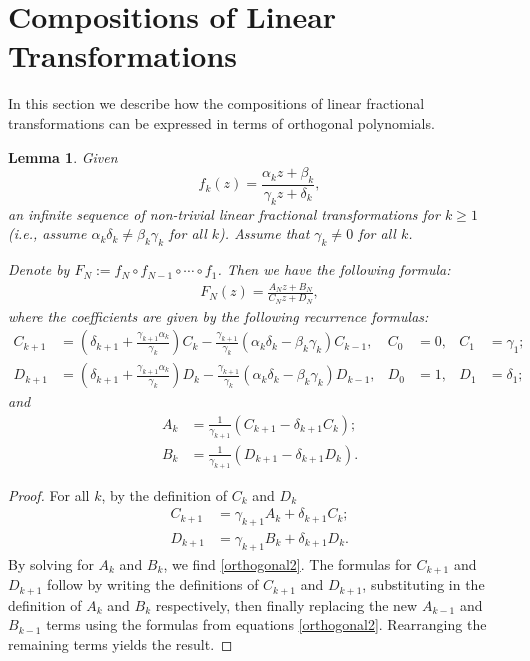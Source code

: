 \documentclass{amsart}
\newtheorem{lemma}{Lemma}
\theoremstyle{remark}
\theoremstyle{definition}
\newcommand{\al}{\alpha}
\newcommand{\be}{\beta}
\newcommand{\ga}{\gamma}
\newcommand{\de}{\delta}
\begin{document}
\section{Compositions of Linear Transformations}\label{sec:compositionoflineartransformations}

In this section we describe how the compositions of linear fractional transformations can be expressed in terms of orthogonal polynomials.

\begin{lemma}\label{generalFormComposition}
Given \[
f_k(z)= \frac{\al_k z+\be_k}{\ga_k z +\de_k},\] an infinite sequence of non-trivial linear fractional transformations for $k\geq 1$ (i.e., assume $\al_k\de_k\neq \be_k\ga_k$ for all $k$). Assume that $\gamma_k \neq 0$ for all $k$.

Denote by $F_N:=f_N \circ f_{N-1} \circ \cdots \circ f_1$. Then we have the following formula:
\begin{align*}
F_N(z) = \frac{A_N z + B_N}{C_N z +D_N},
\end{align*}
where the coefficients are given by the following recurrence formulas:
\begin{align}
C_{k+1} &= \left(\de_{k+1}+\frac{\ga_{k+1}\al_{k}}{\ga_{k}}\right)C_k - \frac{\ga_{k+1}}{\ga_{k}}\left(\al_k\de_k-\be_k\ga_k\right)C_{k-1}, & C_0 &= 0, & C_1&= \ga_1;& \nonumber \\
D_{k+1} &= \left(\de_{k+1}+\frac{\ga_{k+1}\al_{k}}{\ga_{k}}\right)D_k - \frac{\ga_{k+1}}{\ga_{k}}\left(\al_k\de_k-\be_k\ga_k\right)D_{k-1}, & D_0 &= 1, & D_1&= \de_1;& \label{orthogonal}
\end{align}
and
\begin{align} \label{orthogonal2}
A_{k} &= \frac{1}{\ga_{k+1}}(C_{k+1}-\de_{k+1}C_{k});\nonumber\\
B_{k} &= \frac{1}{\ga_{k+1}}(D_{k+1}-\de_{k+1}D_{k}) .
\end{align}
\end{lemma}

\begin{proof}
For all $k$, by the definition of $C_{k}$ and $D_{k}$
\begin{align*}
C_{k+1} &= \gamma_{k+1}A_{k}+\delta_{k+1}C_{k};\\
D_{k+1} &= \gamma_{k+1}B_{k}+\delta_{k+1}D_{k}.
\end{align*} 
By solving for $A_{k}$ and $B_{k}$, we find \eqref{orthogonal2}. 
The formulas for $C_{k+1}$ and $D_{k+1}$ follow by writing the definitions of $C_{k+1}$ and $D_{k+1}$, substituting in the definition of $A_{k}$ and $B_{k}$ respectively, then finally replacing the new $A_{k-1}$ and $B_{k-1}$ terms using the formulas from 
equations \eqref{orthogonal2}. Rearranging the remaining terms yields the result.
\end{proof}
\end{document}
